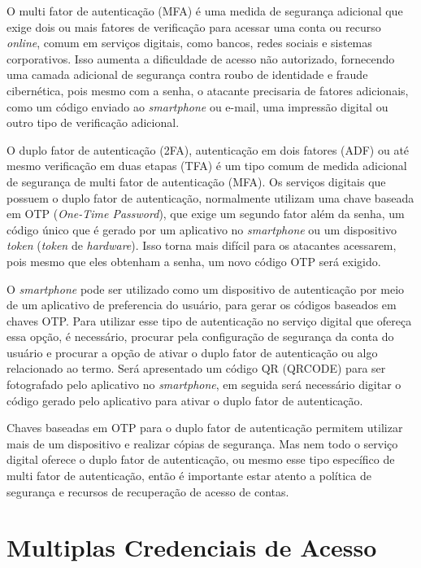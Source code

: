 \documentclass[12pt]{article}
\begin{document}
O multi fator de autenticação (MFA) é uma medida de segurança adicional que
exige dois ou mais fatores de verificação para acessar uma conta ou
recurso \textit{online}, comum em serviços digitais, como bancos, redes sociais e
sistemas corporativos.
Isso aumenta a dificuldade de acesso não autorizado, fornecendo uma camada
adicional de segurança contra roubo de identidade e fraude cibernética, pois
mesmo com a senha, o atacante precisaria de fatores adicionais, como um código
enviado ao \textit{smartphone} ou e-mail, uma impressão digital ou outro tipo de
verificação adicional.

O duplo fator de autenticação (2FA), autenticação em dois fatores (ADF) ou
até mesmo verificação em duas etapas (TFA) é um tipo comum de medida adicional
de segurança de multi fator de autenticação (MFA).
Os serviços digitais que possuem o duplo fator de autenticação, normalmente
utilizam uma chave baseada em OTP (\textit{One-Time Password}), que exige um segundo fator
além da senha, um código único que é gerado por um aplicativo no \textit{smartphone} ou um
dispositivo \textit{token} (\textit{token} de \textit{hardware}).
Isso torna mais difícil para os atacantes acessarem, pois mesmo que eles
obtenham a senha, um novo código OTP será exigido.

O \textit{smartphone} pode ser utilizado como um dispositivo de autenticação por meio de um
aplicativo de preferencia do usuário, para gerar os códigos baseados em chaves OTP.
Para utilizar esse tipo de autenticação no serviço digital que ofereça essa opção,
é necessário, procurar pela configuração de segurança da conta do usuário e procurar
a opção de ativar o duplo fator de autenticação ou algo relacionado ao termo.
Será apresentado um código QR (QRCODE) para ser fotografado pelo aplicativo no \textit{smartphone},
em seguida será necessário digitar o código gerado pelo aplicativo para ativar o
duplo fator de autenticação.

Chaves baseadas em OTP para o duplo fator de autenticação permitem utilizar mais
de um dispositivo e realizar cópias de segurança.
Mas nem todo o serviço digital oferece o duplo fator de autenticação, ou
mesmo esse tipo específico de multi fator de autenticação, então é importante
estar atento a política de segurança e recursos de recuperação de acesso de contas.

\section{Multiplas Credenciais de Acesso}
\end{document}
